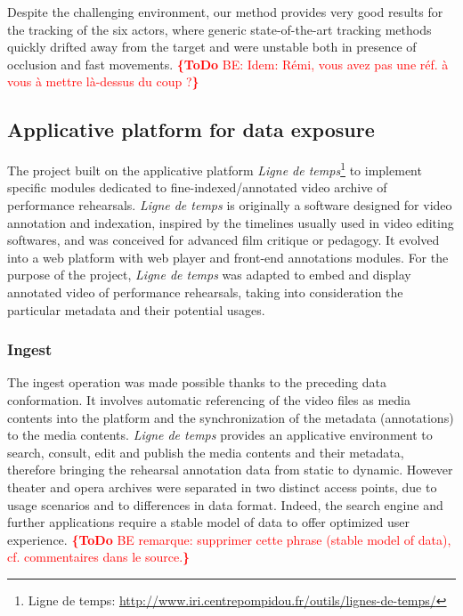 \documentclass[conference]{IEEEtran}
\newcommand{\todo}[1]{\noindent\textcolor{red}{{\bf \{ToDo} #1{\bf \}}}}
\begin{document}
Despite the challenging environment, our method provides very good results for the tracking of the six actors, where generic state-of-the-art tracking methods quickly drifted away from the target and were unstable both in presence of occlusion and fast movements. 
\todo{BE: Idem: Rémi, vous avez pas une réf. à vous à mettre là-dessus du coup ?}



\subsection{Applicative platform for data exposure}
The project built on the applicative platform \emph{Ligne de temps}\footnote{Ligne de temps: \url{http://www.iri.centrepompidou.fr/outils/lignes-de-temps/}} to implement specific modules dedicated to fine-indexed/annotated video archive of performance rehearsals. \emph{Ligne de temps} is originally a software designed for video annotation and indexation, inspired by the timelines usually used in video editing softwares, and was conceived for advanced film critique or pedagogy. It evolved into a web platform with web player and front-end annotations modules. For the purpose of the project, \emph{Ligne de temps} was adapted to embed and display annotated video of performance rehearsals, taking into consideration the particular metadata and their potential usages.

\subsubsection{Ingest}
The ingest operation was made possible thanks to the preceding data conformation. It involves automatic referencing of the video files as media contents into the platform and the synchronization of the metadata (annotations) to the media contents. \emph{Ligne de temps} provides an applicative environment to search, consult, edit and publish the media contents and their metadata, therefore bringing the rehearsal annotation data from static to dynamic. \linebreak
However theater and opera archives were separated in two distinct access points, due to usage scenarios and to differences in data format.
 Indeed, the search engine and further applications require a stable model of data to offer optimized user experience.
\todo{BE remarque: supprimer cette phrase (stable model of data), cf. commentaires dans le source.}
\end{document}
